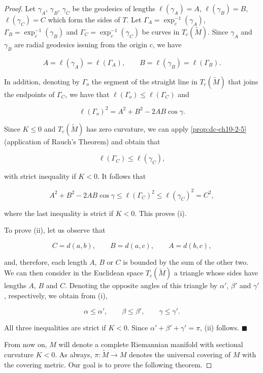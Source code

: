 \begin{proof}
  Let $\gamma_A$, $\gamma_B$, $\gamma_C$ be the geodesics of lengths
  $\ell(\gamma_A)=A$, $\ell(\gamma_B)=B$, $\ell(\gamma_C)=C$ which form the sides of
  $T$. Let $\Gamma_A=\exp_c^{-1}(\gamma_A)$, $\Gamma_B=\exp_c^{-1}(\gamma_B)$ and
  $\Gamma_C=\exp_c^{-1}(\gamma_C)$ be curves in $T_c(\tilde{M})$. Since $\gamma_A$
  and $\gamma_B$ are radial geodesics issuing from the origin $c$, we have
  
  $$
  A=\ell(\gamma_A)=\ell(\Gamma_A),\qquad B=\ell(\gamma_B)=\ell(\Gamma_B).
  $$
  
  In addition, denoting by $\Gamma_o$ the segment of the straight line in
  $T_c(\tilde{M})$ that joins the endpoints of $\Gamma_C$, we have that
  $\ell(\Gamma_o)\leq\ell(\Gamma_C)$ and
  
  $$
  \ell(\Gamma_o)^2=A^2+B^2-2AB\cos\gamma.
  $$
  
  Since $K\leq 0$ and $T_c(\tilde{M})$ has zero curvature, we can apply \cref{prop:dc-ch10-2-5} (application of Rauch's Theorem) and obtain that
  
  $$
  \ell(\Gamma_C)\leq\ell(\gamma_C),
  $$
  
  with strict inequality if $K<0$.
  It follows that
  
  $$
  A^2+B^2-2AB\cos\gamma\leq\ell(\Gamma_C)^2\leq\ell(\gamma_C)^2=C^2,
  $$
  
  where the last inequality is strict if $K<0$.
  This proves (i).
  
  To prove (ii), let us observe that
  
  $$
  C=d(a,b),\qquad B=d(a,c),\qquad A=d(b,c),
  $$
  
  and, therefore, each length $A$, $B$ or $C$ is bounded by the sum of the other
  two. We can then consider in the Euclidean space $T_c(\tilde{M})$ a triangle whose
  sides have lengths $A$, $B$ and $C$. Denoting the opposite angles of this triangle
  by $\alpha'$, $\beta'$ and $\gamma'$, respectively, we obtain from (i),
  
  $$
  \alpha\leq\alpha',\qquad\beta\leq\beta',\qquad\gamma\leq\gamma'.
  $$
  
  All three inequalities are strict if $K<0$.
  Since $\alpha'+\beta'+\gamma'=\pi$, (ii) follows. $\blacksquare$
  
  From now on, $M$ will denote a complete Riemannian manifold with sectional
  curvature $K<0$. As always, $\pi:\tilde{M}\to M$ denotes the universal covering of
  $M$ with the covering metric. Our goal is to prove the following theorem.
\end{proof}

